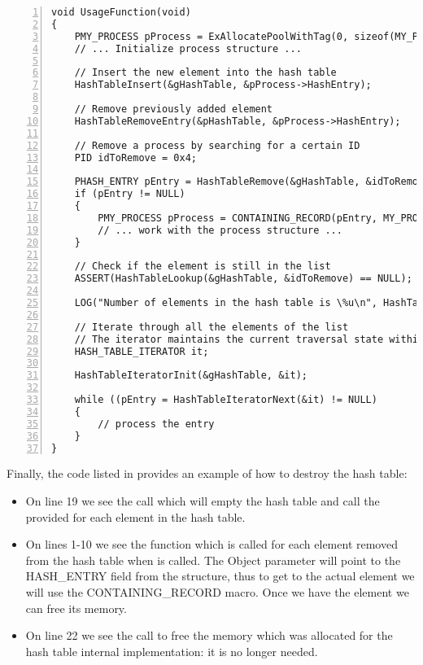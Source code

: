 \begin{appendices}
\begin{lstlisting}[caption={Hash Usage Example},label={lst:HashUsageEg},numbers=left]
void UsageFunction(void)
{
	PMY_PROCESS pProcess = ExAllocatePoolWithTag(0, sizeof(MY_PROCESS), HEAP_TEST_TAG, 0);
	// ... Initialize process structure ...

	// Insert the new element into the hash table
	HashTableInsert(&gHashTable, &pProcess->HashEntry);
	
	// Remove previously added element
	HashTableRemoveEntry(&pHashTable, &pProcess->HashEntry);
	
	// Remove a process by searching for a certain ID
	PID idToRemove = 0x4;
	
	PHASH_ENTRY pEntry = HashTableRemove(&gHashTable, &idToRemove);
	if (pEntry != NULL)
	{
		PMY_PROCESS pProcess = CONTAINING_RECORD(pEntry, MY_PROCESS, HASH_ENTRY);
		// ... work with the process structure ...
	}
	
	// Check if the element is still in the list
	ASSERT(HashTableLookup(&gHashTable, &idToRemove) == NULL);
	
	LOG("Number of elements in the hash table is \%u\n", HashTableSize(&gHashTable));
	
	// Iterate through all the elements of the list
	// The iterator maintains the current traversal state within the hash table
	HASH_TABLE_ITERATOR it;
	
	HashTableIteratorInit(&gHashTable, &it);
	
	while ((pEntry = HashTableIteratorNext(&it) != NULL)
	{
		// process the entry
	}
}
\end{lstlisting}

Finally, the code listed in  provides an example of how to destroy the
hash table:
\begin{itemize}
	\item On line 19 we see the call which will empty the hash table and call the provided
	 for each element in the hash table.
	
	\item On lines 1-10 we see the function which is called for each element removed from the hash
	table when  is called. The Object parameter will point to the HASH\_ENTRY
	field from the structure, thus to get to the actual element we will use the CONTAINING\_RECORD
	macro. Once we have the element we can free its memory.
	
	\item On line 22 we see the call to free the memory which was allocated for the hash table
	internal implementation: it is no longer needed.
\end{itemize}


\end{appendices}
